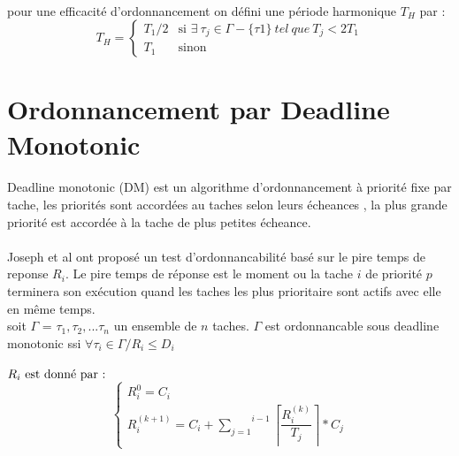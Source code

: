 \documentclass[french]{book}
\begin{document}
\paragraph{}
pour une efficacité d'ordonnancement on défini une période harmonique $T_{H}$ par : \\
	$$T_{H}=\left\lbrace
\begin{array}{ll}
T_{1}/2&\text{si } \exists\ \tau_{j} \in \Gamma- \{\tau{1}\}\ tel\ que\ T_{j} < 2T_{1}
\\
 T_{1}&
\text{sinon}
\end{array}\right.$$

\section{Ordonnancement par Deadline Monotonic}
\paragraph{}
Deadline monotonic (DM) est un algorithme d'ordonnancement à priorité fixe par tache, les priorités sont accordées au taches selon leurs écheances , la plus grande priorité est accordée à la tache de plus petites écheance.
\paragraph{}
Joseph et al ont proposé un test d’ordonnancabilité basé sur le pire temps de reponse $R_{i}$.
Le pire temps de réponse est le moment ou la tache $i$ de priorité $p$ terminera son exécution quand les taches les plus prioritaire sont actifs avec elle en même temps.\\
soit $\Gamma$ = $\tau_{1},\tau_{2},. . . \tau_{n}$ un ensemble de $n$ taches.
$\Gamma$ est ordonnancable sous deadline monotonic ssi $\forall \tau_{i} \in \Gamma / R_{i} \leq D_{i}$
\paragraph{}
$R_{i} \text{ est donné par : }\\ $
$$\left\lbrace
\begin{array}{l}
R_{i}^0=C_{i}
\\
 R_{i}^{(k+1)}=C_{i}+\overset{i-1}{\underset{j=1}{\sum}}  \left \lceil \dfrac{R_{i}^{(k)}}{T_{j}} \right \rceil * C_{j}  
\end{array}\right.$$
\\
\\
\end{document}
